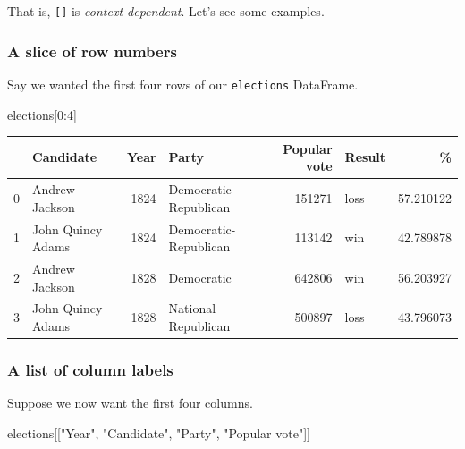\documentclass[
  letterpaper,
  DIV=11,
  numbers=noendperiod]{scrreprt}
\newenvironment{Shaded}{\begin{snugshade}}{\end{snugshade}}
\newcommand{\DecValTok}[1]{\textcolor[rgb]{0.68,0.00,0.00}{#1}}
\newcommand{\NormalTok}[1]{\textcolor[rgb]{0.00,0.23,0.31}{#1}}
\newcommand{\StringTok}[1]{\textcolor[rgb]{0.13,0.47,0.30}{#1}}
\begin{document}
That is, \texttt{{[}{]}} is \emph{context dependent}. Let's see some
examples.

\hypertarget{a-slice-of-row-numbers}{%
\subsubsection{A slice of row numbers}\label{a-slice-of-row-numbers}}

Say we wanted the first four rows of our \texttt{elections} DataFrame.

\begin{Shaded}
\begin{Highlighting}[]
\NormalTok{elections[}\DecValTok{0}\NormalTok{:}\DecValTok{4}\NormalTok{]}
\end{Highlighting}
\end{Shaded}

\begin{tabular}{llrlrlr}
\toprule
{} &          Candidate &  Year &                  Party &  Popular vote & Result &          \% \\
\midrule
0 &     Andrew Jackson &  1824 &  Democratic-Republican &        151271 &   loss &  57.210122 \\
1 &  John Quincy Adams &  1824 &  Democratic-Republican &        113142 &    win &  42.789878 \\
2 &     Andrew Jackson &  1828 &             Democratic &        642806 &    win &  56.203927 \\
3 &  John Quincy Adams &  1828 &    National Republican &        500897 &   loss &  43.796073 \\
\bottomrule
\end{tabular}

\hypertarget{a-list-of-column-labels}{%
\subsubsection{A list of column labels}\label{a-list-of-column-labels}}

Suppose we now want the first four columns.

\begin{Shaded}
\begin{Highlighting}[]
\NormalTok{elections[[}\StringTok{"Year"}\NormalTok{, }\StringTok{"Candidate"}\NormalTok{, }\StringTok{"Party"}\NormalTok{, }\StringTok{"Popular vote"}\NormalTok{]]}
\end{Highlighting}
\end{Shaded}
\end{document}
